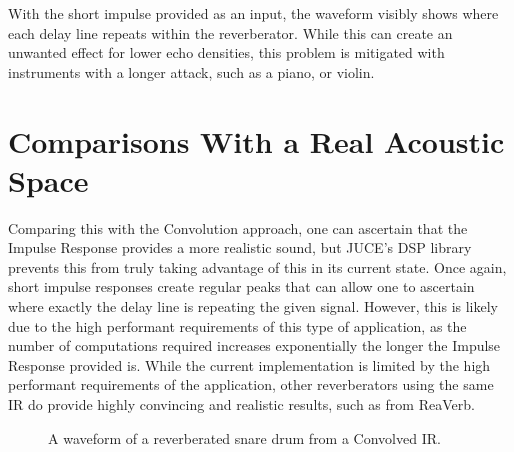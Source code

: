 With the short impulse provided as an input, the waveform visibly shows where each delay line repeats within the reverberator. While this can create an unwanted effect for lower echo densities, this problem is mitigated with instruments with a longer attack, such as a piano, or violin.

\section{Comparisons With a Real Acoustic Space}
Comparing this with the Convolution approach, one can ascertain that the Impulse Response provides a more realistic sound, but JUCE's DSP library prevents this from truly taking advantage of this in its current state. Once again, short impulse responses create regular peaks that can allow one to ascertain where exactly the delay line is repeating the given signal. However, this is likely due to the high performant requirements of this type of application, as the number of computations required increases exponentially the longer the Impulse Response provided is. While the current implementation is limited by the high performant requirements of the application, other reverberators using the same IR do provide highly convincing and realistic results, such as from ReaVerb.


\begin{figure}[h] %
	\begin{center}
		\caption{A waveform of a reverberated snare drum from a Convolved IR.}
	\end{center}
\end{figure}
